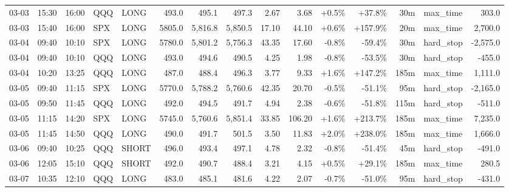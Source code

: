 \documentclass[11pt,a4paper,twoside]{article}
\begin{document}
\begin{landscape}
\begin{center}
\begin{longtable}{>{\color{txtmain}}l l l l l r r r r r r r r >{\color{txtmain}}l r}
03-03 & 15:30 & 16:00 & QQQ & LONG & 493.0 & 495.1 & 497.3 & 2.67 & 3.68 & \textcolor{wingreen}{+0.5\%} & \textcolor{wingreen}{+37.8\%} & 30m & max\_time & \textcolor{wingreen}{303.0} \\
03-03 & 15:40 & 16:00 & SPX & LONG & 5805.0 & 5,816.8 & 5,850.5 & 17.10 & 44.10 & \textcolor{wingreen}{+0.6\%} & \textcolor{wingreen}{+157.9\%} & 20m & max\_time & \textcolor{wingreen}{2,700.0} \\
03-04 & 09:40 & 10:10 & SPX & LONG & 5780.0 & 5,801.2 & 5,756.3 & 43.35 & 17.60 & \textcolor{lossred}{-0.8\%} & \textcolor{lossred}{-59.4\%} & 30m & hard\_stop & \textcolor{lossred}{-2,575.0} \\
03-04 & 09:40 & 10:10 & QQQ & LONG & 493.0 & 494.6 & 490.5 & 4.25 & 1.98 & \textcolor{lossred}{-0.8\%} & \textcolor{lossred}{-53.5\%} & 30m & hard\_stop & \textcolor{lossred}{-455.0} \\
03-04 & 10:20 & 13:25 & QQQ & LONG & 487.0 & 488.4 & 496.3 & 3.77 & 9.33 & \textcolor{wingreen}{+1.6\%} & \textcolor{wingreen}{+147.2\%} & 185m & max\_time & \textcolor{wingreen}{1,111.0} \\
03-05 & 09:40 & 11:15 & SPX & LONG & 5770.0 & 5,788.2 & 5,760.6 & 42.35 & 20.70 & \textcolor{lossred}{-0.5\%} & \textcolor{lossred}{-51.1\%} & 95m & hard\_stop & \textcolor{lossred}{-2,165.0} \\
03-05 & 09:50 & 11:45 & QQQ & LONG & 492.0 & 494.5 & 491.7 & 4.94 & 2.38 & \textcolor{lossred}{-0.6\%} & \textcolor{lossred}{-51.8\%} & 115m & hard\_stop & \textcolor{lossred}{-511.0} \\
03-05 & 11:15 & 14:20 & SPX & LONG & 5745.0 & 5,760.6 & 5,851.4 & 33.85 & 106.20 & \textcolor{wingreen}{+1.6\%} & \textcolor{wingreen}{+213.7\%} & 185m & max\_time & \textcolor{wingreen}{7,235.0} \\
03-05 & 11:45 & 14:50 & QQQ & LONG & 490.0 & 491.7 & 501.5 & 3.50 & 11.83 & \textcolor{wingreen}{+2.0\%} & \textcolor{wingreen}{+238.0\%} & 185m & max\_time & \textcolor{wingreen}{1,666.0} \\
03-06 & 09:40 & 10:25 & QQQ & SHORT & 496.0 & 493.4 & 497.1 & 4.78 & 2.32 & \textcolor{lossred}{-0.8\%} & \textcolor{lossred}{-51.4\%} & 45m & hard\_stop & \textcolor{lossred}{-491.0} \\
03-06 & 12:05 & 15:10 & QQQ & SHORT & 492.0 & 490.7 & 488.4 & 3.21 & 4.15 & \textcolor{wingreen}{+0.5\%} & \textcolor{wingreen}{+29.1\%} & 185m & max\_time & \textcolor{wingreen}{280.5} \\
03-07 & 10:35 & 12:10 & QQQ & LONG & 483.0 & 485.1 & 481.6 & 4.22 & 2.07 & \textcolor{lossred}{-0.7\%} & \textcolor{lossred}{-51.0\%} & 95m & hard\_stop & \textcolor{lossred}{-431.0} \\

\end{longtable}
\end{center}
\end{landscape}
\end{document}

